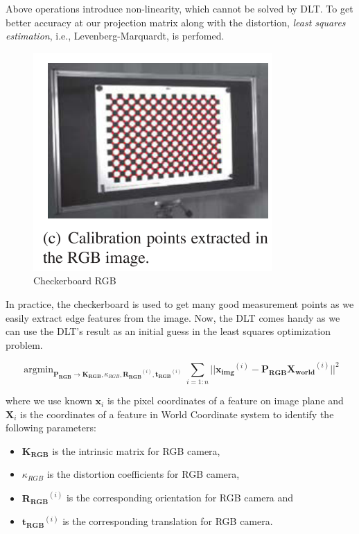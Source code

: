 \documentclass[a4paper]{report}
\numberwithin{figure}{section}
\newcommand{\argmin}{\mathop{\mathrm{argmin}}}
\begin{document}
Above operations introduce non-linearity, which cannot be solved by DLT.
To get better accuracy at our projection matrix along with the distortion, 
\textit{least squares estimation}, i.e., Levenberg-Marquardt, is perfomed.

\begin{figure}[H]
	\centering
  \includegraphics[width=0.5\linewidth,natwidth=640,natheight=640]
  {fig/ref_imgs/checkerboard_rgb.png}
  \caption{Checkerboard RGB}
  \label{fig:checkerboard_rgb}
\end{figure}

In practice, the checkerboard is used to get many good measurement points 
as  we easily extract edge features from the image. Now, the DLT comes handy
as we can use the DLT's result as an initial guess 
in the least squares optimization problem.

\begin{equation}
  \argmin_{\mathbf{P_{RGB}} \rightarrow \mathbf{K_{RGB}}, \kappa_{RGB}, \mathbf{R_{RGB}}^{(i)}, \mathbf{t_{RGB}}^{(i)}}
  \sum_{i=1:n} || \mathbf{x_{img}}^{(i)} - 
  \mathbf{P_{RGB}} \mathbf{X_{world}}^{(i)} ||^2
\end{equation}\label{eq:proj_lsq}

where we use known 
$\mathbf{x}_i$ is the pixel coordinates of a feature on image plane and 
$\mathbf{X}_i$ is the coordinates of a feature in World Coordinate system
to identify the following parameters:

\begin{itemize}
  \item $\mathbf{K_{RGB}}$ is the intrinsic matrix for RGB camera, 
  \item $\kappa_{RGB}$ is the distortion coefficients for RGB camera, 
  \item $\mathbf{R_{RGB}}^{(i)}$ is the corresponding orientation for RGB camera and 
  \item $\mathbf{t_{RGB}}^{(i)}$ is the corresponding translation for RGB camera.
\end{itemize}
\end{document}
